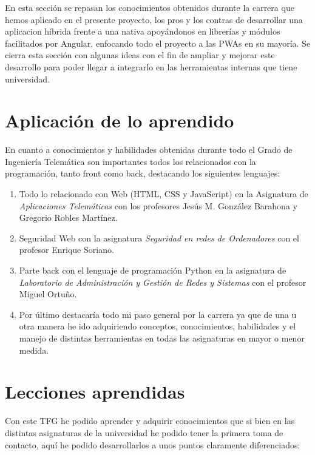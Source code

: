 \documentclass[a4paper, 12pt]{book}
\begin{document}
En esta sección se repasan los conocimientos obtenidos durante la carrera que hemos aplicado en el presente proyecto, los pros y los contras de desarrollar una aplicacion híbrida frente a una nativa apoyándonos en librerías y módulos facilitados por Angular, enfocando todo el proyecto a las PWAs en su mayoría. Se cierra esta sección con algunas ideas con el fin de ampliar y mejorar este desarrollo para poder llegar a integrarlo en las herramientas internas que tiene universidad.

\section{Aplicación de lo aprendido}
\label{sec:aplicacion}

En cuanto a conocimientos y habilidades obtenidas durante todo el Grado de Ingeniería Telemática son importantes todos los relacionados con la programación, tanto front como back, destacando los siguientes lenguajes:

\begin{enumerate}
  \item Todo lo relacionado con Web (HTML, CSS y JavaScript) en la Asignatura de \textit{Aplicaciones Telemáticas} con los profesores Jesús M. González Barahona y Gregorio Robles Martínez.
  \item Seguridad Web con la asignatura \textit{Seguridad en redes de Ordenadores} con el profesor Enrique Soriano.
  \item Parte back con el lenguaje de programación Python en la asignatura de \textit{Laboratorio de Administración y Gestión de Redes y Sistemas} con el profesor Miguel Ortuño.
  \item Por último destacaría todo mi paso general por la carrera ya que de una u otra manera he ido adquiriendo conceptos, conocimientos, habilidades y el manejo de distintas herramientas en todas las asignaturas en mayor o menor medida.
\end{enumerate}


\section{Lecciones aprendidas}
\label{sec:lecciones_aprendidas}

Con este TFG he podido aprender y adquirir conocimientos que si bien en las distintas asignaturas de la universidad he podido tener la primera toma de contacto, aquí he podido desarrollarlos a unos puntos claramente diferenciados:
\end{document}
